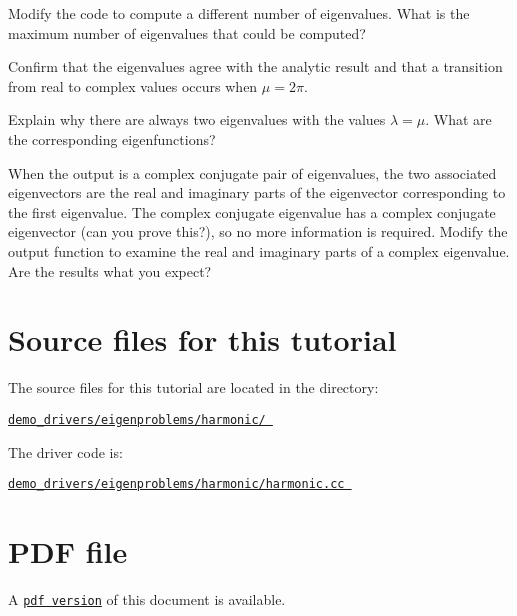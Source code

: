 \begin{DoxyEnumerate}
\item Modify the code to compute a different number of eigenvalues. What is the maximum number of eigenvalues that could be computed?
\item Confirm that the eigenvalues agree with the analytic result and that a transition from real to complex values occurs when $ \mu = 2\pi $.
\item Explain why there are always two eigenvalues with the values $\lambda = \mu$. What are the corresponding eigenfunctions?
\item When the output is a complex conjugate pair of eigenvalues, the two associated eigenvectors are the real and imaginary parts of the eigenvector corresponding to the first eigenvalue. The complex conjugate eigenvalue has a complex conjugate eigenvector (can you prove this?), so no more information is required. Modify the output function to examine the real and imaginary parts of a complex eigenvalue. Are the results what you expect?
\end{DoxyEnumerate}

 

\hypertarget{index_sources}{}\section{Source files for this tutorial}\label{index_sources}

\begin{DoxyItemize}
\item The source files for this tutorial are located in the directory\+: \begin{center} \href{../../../../demo_drivers/eigenproblems/harmonic/}{\tt demo\+\_\+drivers/eigenproblems/harmonic/ } \end{center} 
\item The driver code is\+: \begin{center} \href{../../../../demo_drivers/eigenproblems/harmonic/harmonic.cc}{\tt demo\+\_\+drivers/eigenproblems/harmonic/harmonic.\+cc } \end{center} 
\end{DoxyItemize}



 

 \hypertarget{index_pdf}{}\section{P\+D\+F file}\label{index_pdf}
A \href{../latex/refman.pdf}{\tt pdf version} of this document is available. 
